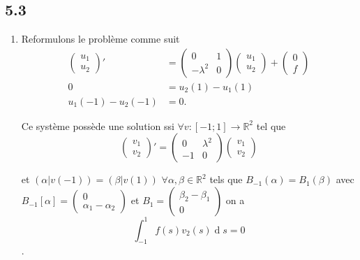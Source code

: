 \documentclass[fontsize=12pt]{article}
\DeclareMathOperator{\newdiff}{d} %
\newcommand{\dif}{\newdiff\!}
\begin{document}
\subsection*{5.3}
\begin{enumerate}
  \item
    Reformulons le problème comme suit
    \begin{align*}
    \begin{pmatrix}
      u_1\\u_2
    \end{pmatrix}' & =
    \begin{pmatrix}
      0 & 1\\-\lambda^2 & 0
    \end{pmatrix}
    \begin{pmatrix}
      u_1\\u_2
    \end{pmatrix}
    +
    \begin{pmatrix}
      0\\f
    \end{pmatrix}\\
    0 & =  u_2(1) - u_1(1)\\
    u_1(-1) - u_2(-1) & = 0.
    \end{align*}

    Ce système possède une solution
    ssi $\forall v: [-1;1] \to \mathbb{R}^2$ tel que
    \[\begin{pmatrix}
      v_1\\v_2
    \end{pmatrix}' =
    \begin{pmatrix}
      0 & \lambda^2\\-1 & 0
    \end{pmatrix}
    \begin{pmatrix}v_1\\v_2
    \end{pmatrix}\]

    et $(\alpha|v(-1)) = (\beta|v(1))$ $\forall \alpha,\beta \in\mathbb{R}^2$
    tels que $B_{-1}(\alpha) = B_1(\beta)$
    avec $B_{-1}[\alpha] =
    \begin{pmatrix}
      0\\\alpha_1-\alpha_2
    \end{pmatrix}$ et
    $B_1 =
    \begin{pmatrix}
      \beta_2-\beta_1\\0
    \end{pmatrix}$
    on a
    \[ \int_{-1}^1 f(s)v_2(s) \dif s = 0 \].



\end{enumerate}
\end{document}
